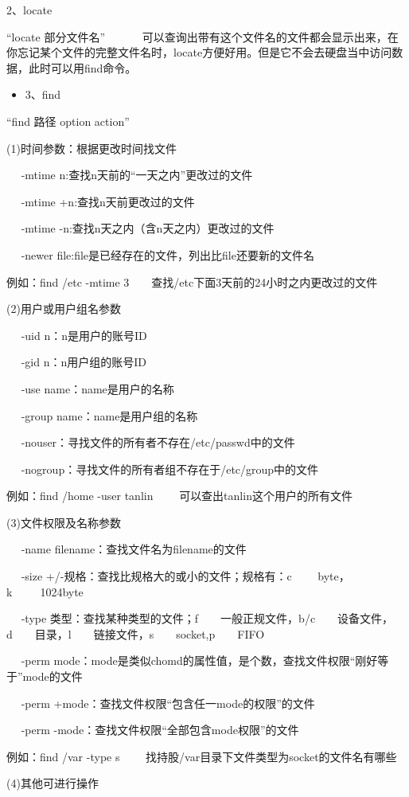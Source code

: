 \documentclass{article}
\begin{document}
2、locate

“locate 部分文件名” ~~~~~~可以查询出带有这个文件名的文件都会显示出来，在你忘记某个文件的完整文件名时，locate方便好用。但是它不会去硬盘当中访问数据，此时可以用find命令。
\begin{itemize}
\item 3、find
\end{itemize}

“find 路径 option action” 

 (1)时间参数：根据更改时间找文件

~~ -mtime n:查找n天前的“一天之内”更改过的文件

~~ -mtime +n:查找n天前更改过的文件

~~ -mtime -n:查找n天之内（含n天之内）更改过的文件

~~ -newer file:file是已经存在的文件，列出比file还要新的文件名

例如：find /etc -mtime 3~~~~查找/etc下面3天前的24小时之内更改过的文件

(2)用户或用户组名参数

~~ -uid n：n是用户的账号ID

~~ -gid n：n用户组的账号ID

~~ -use name：name是用户的名称

~~ -group name：name是用户组的名称

~~ -nouser：寻找文件的所有者不存在/etc/passwd中的文件

~~ -nogroup：寻找文件的所有者组不存在于/etc/group中的文件

例如：find /home -user tanlin ~~~~可以查出tanlin这个用户的所有文件

(3)文件权限及名称参数

~~ -name filename：查找文件名为filename的文件

~~ -size +/-规格：查找比规格大的或小的文件；规格有：c ~~~~byte，k~~~~~1024byte

~~ -type 类型：查找某种类型的文件；f~~~~一般正规文件，b/c~~~~设备文件，d~~~~目录，l~~~~链接文件，s~~~~socket,p~~~~FIFO

~~ -perm mode：mode是类似chomd的属性值，是个数，查找文件权限“刚好等于”mode的文件

~~ -perm +mode：查找文件权限“包含任一mode的权限”的文件

~~ -perm -mode：查找文件权限“全部包含mode权限”的文件

例如：find /var -type s  ~~~~找持股/var目录下文件类型为socket的文件名有哪些

(4)其他可进行操作
\end{document}
